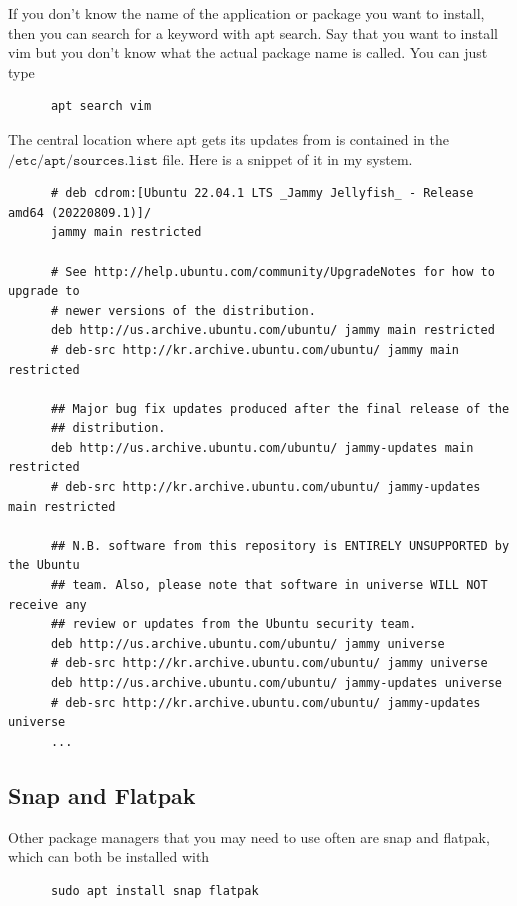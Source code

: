\documentclass{article}
\begin{document}
    If you don't know the name of the application or package you want to install, then you can search for a keyword with apt search. Say that you want to install vim but you don't know what the actual package name is called. You can just type 

    \begin{lstlisting}
      apt search vim
    \end{lstlisting}

    The central location where apt gets its updates from is contained in the $\texttt{/etc/apt/sources.list}$ file. Here is a snippet of it in my system. 
    \begin{lstlisting}
      # deb cdrom:[Ubuntu 22.04.1 LTS _Jammy Jellyfish_ - Release amd64 (20220809.1)]/ 
      jammy main restricted

      # See http://help.ubuntu.com/community/UpgradeNotes for how to upgrade to
      # newer versions of the distribution.
      deb http://us.archive.ubuntu.com/ubuntu/ jammy main restricted
      # deb-src http://kr.archive.ubuntu.com/ubuntu/ jammy main restricted

      ## Major bug fix updates produced after the final release of the
      ## distribution.
      deb http://us.archive.ubuntu.com/ubuntu/ jammy-updates main restricted
      # deb-src http://kr.archive.ubuntu.com/ubuntu/ jammy-updates main restricted

      ## N.B. software from this repository is ENTIRELY UNSUPPORTED by the Ubuntu
      ## team. Also, please note that software in universe WILL NOT receive any
      ## review or updates from the Ubuntu security team.
      deb http://us.archive.ubuntu.com/ubuntu/ jammy universe
      # deb-src http://kr.archive.ubuntu.com/ubuntu/ jammy universe
      deb http://us.archive.ubuntu.com/ubuntu/ jammy-updates universe
      # deb-src http://kr.archive.ubuntu.com/ubuntu/ jammy-updates universe
      ...
    \end{lstlisting}

  \subsection{Snap and Flatpak}

    Other package managers that you may need to use often are snap and flatpak, which can both be installed with 
    \begin{lstlisting}
      sudo apt install snap flatpak 
    \end{lstlisting}
\end{document}
